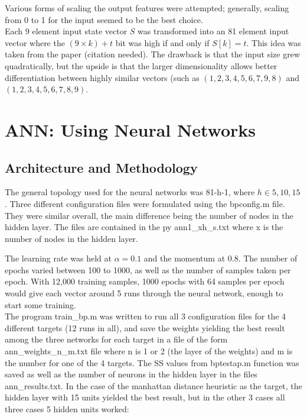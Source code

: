 \documentclass[a4, 12pt]{article}
\begin{document}
Various forms of scaling the output features were attempted; generally, scaling from 0 to 1 for the input seemed to be the best choice. \\

Each 9 element input state vector $S$ was transformed into an 81 element input vector where the $(9 \times k) + t$ bit was high if and only if $S[k] = t$. This idea was taken from the paper (citation needed). The drawback is that the input size grew quadratically, but the upside is that the larger dimensionality allows better differentiation between highly similar vectors (such as $(1, 2, 3, 4, 5, 6, 7, 9, 8)$ and $(1, 2, 3, 4, 5, 6, 7, 8, 9)$.

\section{ANN: Using Neural Networks}
\subsection{Architecture and Methodology}

The general topology used for the neural networks was 81-h-1, where $h \in {5, 10, 15}$.
Three different configuration files were formulated using the bpconfig.m file. They were similar overall, the main difference being the number of nodes in the hidden layer. The files are contained in the py ann1\_xh\_s.txt where x is the number of nodes in the hidden layer.

The learning rate was held at $\alpha = 0.1$ and the momentum at 0.8. The number of epochs varied between 100 to 1000, as well as the number of samples taken per epoch. With 12,000 training samples, 1000 epochs with 64 samples per epoch would give each vector around 5 runs through the neural network, enough to start some training.   \\

The program train\_bp.m was written to run all 3 configuration files for the 4 different targets (12 runs in all), and save the weights yielding the best result among the three networks for each target in a file of the form ann\_weights\_n\_m.txt file where n is 1 or 2 (the layer of the weights) and m is the number for one of the 4 targets. The SS values from bptestap.m function was saved as well as the number of neurons in the hidden layer in the files ann\_results.txt. In the case of the manhattan distance heuristic as the target, the hidden layer with 15 units yielded the best result, but in the other 3 cases all three cases 5 hidden units worked: \\
\end{document}
